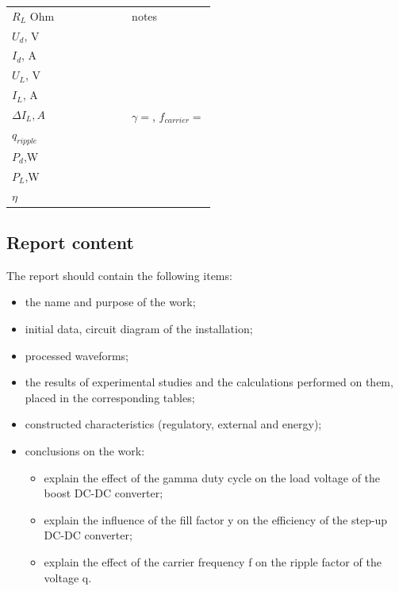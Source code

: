 \documentclass[a4paper,14pt]{article}
\begin{document}
\begin{enumerate}
\begin{tabular}{l|p{10pt}|p{10pt}|p{10pt}|p{10pt}|p{10pt}|p{10pt}|p{100pt}}
        $R_L$ Ohm& &&&&&& notes\\
        \cmidrule{1-8}
        $U_d$, V &&&&&&&\multirow{9}{*}{\begin{minipage}{0.3\textwidth}$\gamma=$, $f_{carrier}=$ \end{minipage}}\\
        \cmidrule{1-7}
        $I_d$, A &&&&&&\\
        \cmidrule{1-7}
$U_L$, V &&&&&&\\
        \cmidrule{1-7}
        $I_L$, A &&&&&&\\
        \cmidrule{1-7}
        ${\scriptstyle \Delta}I_L, A$&&&&&&\\
        \cmidrule{1-7}
        $q_{ripple}$ &&&&&&\\
        \cmidrule{1-7}
$P_d$,W &&&&&&\\
        \cmidrule{1-7}
$P_L$,W &&&&&&\\
        \cmidrule{1-7}
$\eta$&&&&&&\\
\end{tabular}

\end{enumerate}
 

\subsection{Report content}

The report should contain the following items:

\begin{itemize}
	\item the name and purpose of the work;

	\item initial data, circuit diagram of the installation;

	\item processed waveforms;

	\item the results of experimental studies and the calculations performed on them, placed in the corresponding tables;

	\item constructed characteristics (regulatory, external and energy);



	\item conclusions on the work:
		\begin{itemize}
			\item explain the effect of the gamma duty cycle on the load voltage of the boost DC-DC converter;

			\item explain the influence of the fill factor y on the efficiency of the step-up DC-DC converter;

			\item explain the effect of the carrier frequency f on the ripple factor of the voltage q.
		\end{itemize}
\end{itemize}
\end{document}
